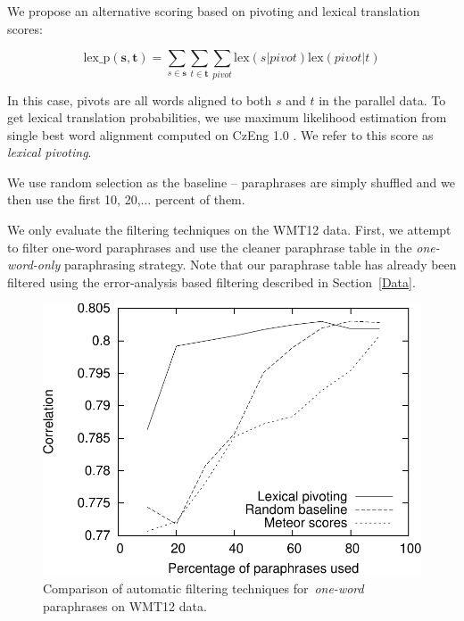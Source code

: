\documentclass[11pt]{article}
\def\Sref#1{Section~\ref{#1}}
\begin{document}
We propose an alternative scoring based on pivoting and lexical translation
scores:

$$\text{lex\_p}(\mathbf{s},\mathbf{t}) = \sum_{s \in \mathbf{s}}\sum_{t \in
\mathbf{t}}\sum_{pivot}\text{lex}(s|pivot)\text{lex}(pivot|t)$$

In this case, pivots are all words aligned to both $s$ and $t$ in the parallel
data. To get lexical translation probabilities, we use maximum likelihood
estimation from single best word alignment computed on CzEng 1.0
\cite{czeng10:lrec2012}. We refer to this score as \emph{lexical pivoting}.

We use random selection as the baseline -- paraphrases are simply shuffled and 
we then use the first 10, 20,$\ldots$ percent of them.

We only evaluate the filtering techniques on the WMT12 data. First, we attempt
to filter one-word paraphrases and use the cleaner paraphrase table in the
\emph{one-word-only} paraphrasing strategy. Note that our paraphrase table has
already been filtered using the error-analysis based filtering described in 
\Sref{Data}.

\begin{figure}[ht]
\begin{center}
\includegraphics[scale=0.55]{filtering-lexical-cropped.pdf}
\caption{Comparison of automatic filtering techniques for~\emph{one-word} 
paraphrases on WMT12 data.} 
\label{fig:filtering-lexical}
\end{center}
\end{figure}
\end{document}
